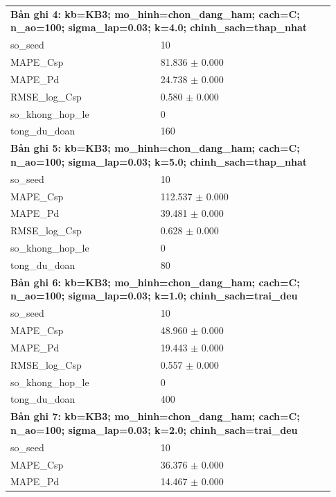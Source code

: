 \begin{longtable}{p{0.43\linewidth}p{0.50\linewidth}}
\midrule
\multicolumn{2}{p{0.95\linewidth}}{\textbf{Bản ghi 4: kb=KB3; mo\_hinh=chon\_dang\_ham; cach=C; n\_ao=100; sigma\_lap=0.03; k=4.0; chinh\_sach=thap\_nhat}} \\
so\_\allowbreak seed & 10 \\
MAPE\_\allowbreak Csp & 81.836 $\pm$ 0.000 \\
MAPE\_\allowbreak Pd & 24.738 $\pm$ 0.000 \\
RMSE\_\allowbreak log\_\allowbreak Csp & 0.580 $\pm$ 0.000 \\
so\_\allowbreak khong\_\allowbreak hop\_\allowbreak le & 0 \\
tong\_\allowbreak du\_\allowbreak doan & 160 \\
\midrule
\multicolumn{2}{p{0.95\linewidth}}{\textbf{Bản ghi 5: kb=KB3; mo\_hinh=chon\_dang\_ham; cach=C; n\_ao=100; sigma\_lap=0.03; k=5.0; chinh\_sach=thap\_nhat}} \\
so\_\allowbreak seed & 10 \\
MAPE\_\allowbreak Csp & 112.537 $\pm$ 0.000 \\
MAPE\_\allowbreak Pd & 39.481 $\pm$ 0.000 \\
RMSE\_\allowbreak log\_\allowbreak Csp & 0.628 $\pm$ 0.000 \\
so\_\allowbreak khong\_\allowbreak hop\_\allowbreak le & 0 \\
tong\_\allowbreak du\_\allowbreak doan & 80 \\
\midrule
\multicolumn{2}{p{0.95\linewidth}}{\textbf{Bản ghi 6: kb=KB3; mo\_hinh=chon\_dang\_ham; cach=C; n\_ao=100; sigma\_lap=0.03; k=1.0; chinh\_sach=trai\_deu}} \\
so\_\allowbreak seed & 10 \\
MAPE\_\allowbreak Csp & 48.960 $\pm$ 0.000 \\
MAPE\_\allowbreak Pd & 19.443 $\pm$ 0.000 \\
RMSE\_\allowbreak log\_\allowbreak Csp & 0.557 $\pm$ 0.000 \\
so\_\allowbreak khong\_\allowbreak hop\_\allowbreak le & 0 \\
tong\_\allowbreak du\_\allowbreak doan & 400 \\
\midrule
\multicolumn{2}{p{0.95\linewidth}}{\textbf{Bản ghi 7: kb=KB3; mo\_hinh=chon\_dang\_ham; cach=C; n\_ao=100; sigma\_lap=0.03; k=2.0; chinh\_sach=trai\_deu}} \\
so\_\allowbreak seed & 10 \\
MAPE\_\allowbreak Csp & 36.376 $\pm$ 0.000 \\
MAPE\_\allowbreak Pd & 14.467 $\pm$ 0.000 \\

\end{longtable}
